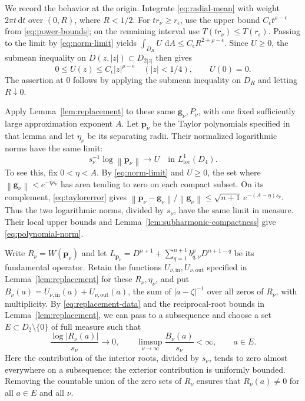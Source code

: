 \documentclass[11pt,letterpaper,reqno]{amsart}
\theoremstyle{remark}
\numberwithin{equation}{section}
\newcommand{\dA}{\,\mathrm dA}
\newcommand{\loc}{\mathrm{loc}}
\newcommand{\norm}[1]{\left\lVert#1\right\rVert}
\newcommand{\gv}{\bm g}
\newcommand{\pv}{\bm p}
\begin{document}
We record the behavior at the origin. Integrate \eqref{eq:radial-mean}
with weight $2\pi t\,\mathrm dt$ over $(0,R)$, where $R<1/2$.
For $tr_\nu\geq r_\epsilon$, use the upper bound
$C_\epsilon t^{\rho-\epsilon}$ from \eqref{eq:power-bounds}; on the
remaining interval use $T(tr_\nu)\leq T(r_\epsilon)$. Passing to the
limit by \eqref{eq:norm-limit} yields
$\int_{D_R}U\,\dA\leq C_\epsilon R^{2+\rho-\epsilon}$.
Since $U\geq0$, the submean inequality on $D(z,|z|)\subset D_{2|z|}$
then gives
\begin{equation}\label{eq:origin-bound}
 0\leq U(z)\leq C_\epsilon|z|^{\rho-\epsilon}
 \quad (|z|<1/4),\qquad U(0)=0.
\end{equation}
The assertion at $0$ follows by applying the submean inequality on
$D_R$ and letting $R\downarrow0$.

Apply Lemma~\ref{lem:replacement} to these same $\gv_\nu,P_\nu$,
with one fixed sufficiently large approximation exponent $A$. Let
$\pv_\nu$ be the Taylor polynomials specified in that lemma and let
$\eta_\nu$ be its separating radii.
Their normalized logarithmic norms have the same limit:
\begin{equation}\label{eq:polynomial-norm}
 s_\nu^{-1}\log\norm{\pv_\nu}\longrightarrow U
 \quad\text{in }L^1_{\loc}(D_4).
\end{equation}
To see this, fix $0<\eta<A$. By \eqref{eq:norm-limit} and $U\geq0$,
the set where $\norm{\gv_\nu}<e^{-\eta s_\nu}$ has area tending to zero
on each compact subset. On its complement,
\eqref{eq:taylorerror} gives
$\norm{\pv_\nu-\gv_\nu}/\norm{\gv_\nu}
 \leq\sqrt{n+1}\,e^{-(A-\eta)s_\nu}$.
Thus the two logarithmic norms, divided by $s_\nu$, have the same
limit in measure. Their local upper bounds and
Lemma~\ref{lem:subharmonic-compactness} give
\eqref{eq:polynomial-norm}.

Write $R_\nu=W(\pv_\nu)$ and let
$L_{\pv_\nu}=D^{n+1}+\sum_{q=1}^{n+1}b^p_{q,\nu}D^{n+1-q}$ be
its fundamental operator. Retain the functions
$U_{\nu,\mathrm{in}},U_{\nu,\mathrm{out}}$ specified in
Lemma~\ref{lem:replacement} for these $R_\nu,\eta_\nu$, and put
$B_\nu(a)=U_{\nu,\mathrm{in}}(a)+U_{\nu,\mathrm{out}}(a)$, the sum
of $|a-\zeta|^{-1}$ over all zeros of $R_\nu$, with multiplicity.
By \eqref{eq:replacement-data} and the reciprocal-root bounds in
Lemma~\ref{lem:replacement}, we can pass to a subsequence and choose a
set $E\subset D_2\setminus\{0\}$ of full measure such that
\begin{equation}\label{eq:good-centers}
 \frac{\log|R_\nu(a)|}{s_\nu}\longrightarrow0,
 \qquad
 \limsup_{\nu\to\infty}\frac{B_\nu(a)}{s_\nu}<\infty,
 \qquad a\in E.
\end{equation}
Here the contribution of the interior roots, divided by $s_\nu$,
tends to zero almost everywhere on a subsequence; the exterior
contribution is uniformly bounded. Removing the countable union of
the zero sets of $R_\nu$ ensures that $R_\nu(a)\ne0$ for all $a\in E$
and all $\nu$.
\end{document}
